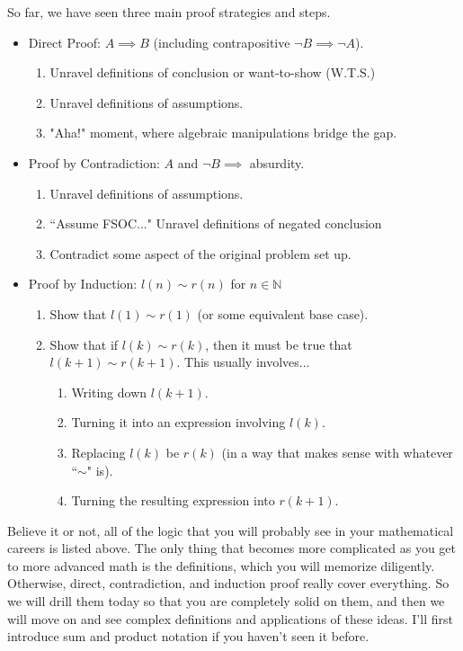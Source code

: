 \documentclass[11pt]{article}
\newcommand{\N}{\ensuremath{\mathbb N}}
\theoremstyle{plain}
\theoremstyle{definition}
\theoremstyle{remark}
\begin{document}
So far, we have seen three main proof strategies and steps. 
\begin{itemize}
    \item Direct Proof: $A \implies B$ (including contrapositive $\neg B \implies \neg A$).
    \begin{enumerate}
        \item Unravel definitions of conclusion or want-to-show (W.T.S.)
        \item Unravel definitions of assumptions.
        \item "Aha!" moment, where algebraic manipulations bridge the gap.
    \end{enumerate}
    \item Proof by Contradiction: $A$ and $\neg B \implies $ absurdity.
    \begin{enumerate}
        \item Unravel definitions of assumptions.
        \item ``Assume FSOC..." Unravel definitions of negated conclusion
        \item Contradict some aspect of the original problem set up.
    \end{enumerate}
    \item Proof by Induction: $l(n) \sim r(n)$ for $n \in \N$
    \begin{enumerate}
        \item Show that $l(1) \sim r(1)$ (or some equivalent base case).
        \item Show that if $l(k) \sim r(k)$, then it must be true that $l(k+1) \sim r(k+1)$. This usually involves...
        \begin{enumerate}
            \item Writing down $l(k+1)$.
            \item Turning it into an expression involving $l(k)$.
            \item Replacing $l(k)$ be $r(k)$ (in a way that makes sense with whatever ``$\sim$" is).
            \item Turning the resulting expression into $r(k+1)$.
        \end{enumerate}
    \end{enumerate}
\end{itemize}

Believe it or not, all of the logic that you will probably see in your mathematical careers is listed above. The only thing that becomes more complicated as you get to more advanced math is the definitions, which you will memorize diligently. Otherwise, direct, contradiction, and induction proof really cover everything. So we will drill them today so that you are completely solid on them, and then we will move on and see complex definitions and applications of these ideas. I'll first introduce sum and product notation if you haven't seen it before.
\end{document}
